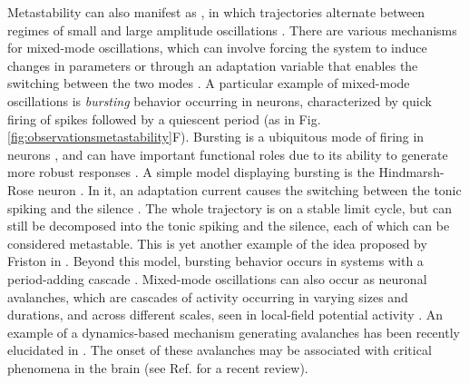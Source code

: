 Metastability can also manifest as , in which trajectories alternate between regimes of small and large amplitude oscillations \cite{desroches2012mixed}. There are various mechanisms for mixed-mode oscillations, which can involve forcing the system to induce changes in parameters or through an adaptation variable that enables the switching between the two modes \cite{desroches2012mixed, rotstein2014mixedmode}. 
A particular example of mixed-mode oscillations is \emph{bursting} behavior occurring in neurons, characterized by quick firing of spikes followed by a quiescent period (as in Fig. \ref{fig:observationsmetastability}F). Bursting is a ubiquitous mode of firing in neurons \cite{fox2015bursting}, and can have important functional roles due to its ability to generate more robust responses \cite{swadlow2001impact}. A simple model displaying bursting is the Hindmarsh-Rose neuron \cite{hindmarshmodel1984}. In it, an adaptation current causes the switching between the tonic spiking and the silence \cite{hindmarshmodel1984}. The whole trajectory is on a stable limit cycle, but can still be decomposed into the tonic spiking and the silence, each of which can be considered metastable. This is yet another example of the idea proposed by Friston in \cite{friston2000transients}. Beyond this model, bursting behavior occurs in systems with a period-adding cascade \cite{kartanak2014route}.  
Mixed-mode oscillations can also occur as neuronal avalanches, which are cascades of activity occurring in varying sizes and durations, and across different scales, seen in local-field potential activity \cite{beggs2003neuronal}. An example of a dynamics-based mechanism generating avalanches has been recently elucidated in \cite{contreras2023scale}. The onset of these avalanches may be associated with critical phenomena in the brain (see Ref. \cite{girardi2021brain} for a recent review).



